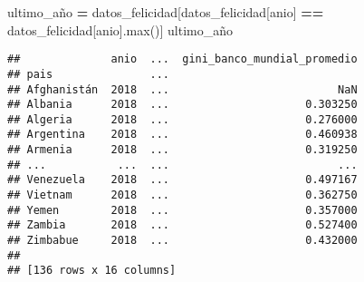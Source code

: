 \documentclass[
]{article}
\newenvironment{Shaded}{\begin{snugshade}}{\end{snugshade}}
\newcommand{\BuiltInTok}[1]{#1}
\newcommand{\NormalTok}[1]{#1}
\newcommand{\OperatorTok}[1]{\textcolor[rgb]{0.81,0.36,0.00}{\textbf{#1}}}
\newcommand{\StringTok}[1]{\textcolor[rgb]{0.31,0.60,0.02}{#1}}
\begin{document}
\begin{Shaded}
\begin{Highlighting}[]
\NormalTok{ultimo\_año }\OperatorTok{=}\NormalTok{ datos\_felicidad[datos\_felicidad[}\StringTok{\textquotesingle{}anio\textquotesingle{}}\NormalTok{] }\OperatorTok{==}\NormalTok{ datos\_felicidad[}\StringTok{\textquotesingle{}anio\textquotesingle{}}\NormalTok{].}\BuiltInTok{max}\NormalTok{()]}
\NormalTok{ultimo\_año}
\end{Highlighting}
\end{Shaded}

\begin{verbatim}
##              anio  ...  gini_banco_mundial_promedio
## pais               ...                             
## Afghanistán  2018  ...                          NaN
## Albania      2018  ...                     0.303250
## Algeria      2018  ...                     0.276000
## Argentina    2018  ...                     0.460938
## Armenia      2018  ...                     0.319250
## ...           ...  ...                          ...
## Venezuela    2018  ...                     0.497167
## Vietnam      2018  ...                     0.362750
## Yemen        2018  ...                     0.357000
## Zambia       2018  ...                     0.527400
## Zimbabue     2018  ...                     0.432000
## 
## [136 rows x 16 columns]
\end{verbatim}
\end{document}
